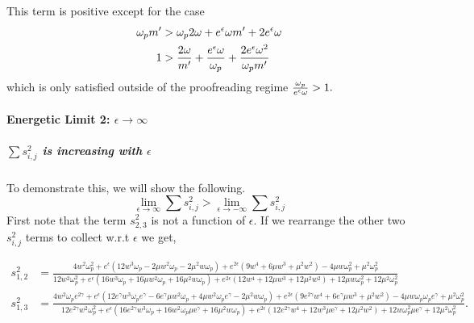 This term is positive except for the case
\[
\begin{aligned}
{\omega_p} m' &> {\omega_p} 2\omega + e^\epsilon \omega m' + 2 e^\epsilon \omega\\
1 &> \frac{2\omega}{m'} + \frac{e^\epsilon\omega}{{\omega_p}} + \frac{2e^\epsilon\omega^2}{{\omega_p} m'}
\end{aligned}
\]
which is only satisfied outside of the proofreading regime $\frac{{\omega_p}}{e^\epsilon\omega} > 1.$

\paragraph{Energetic Limit 2: $\epsilon\to\infty$}
\subparagraph{$\sum{s^2_{i,j}}$ is increasing with $\epsilon$} To demonstrate this, we will show the following.  
\[
\lim_{\epsilon\to\infty}\sum{s^2_{i,j}}>\lim_{\epsilon\to-\infty}\sum{s^2_{i,j}}
\]
First note that the term $s^2_{2,3}$ is not a function of $\epsilon$.  If we rearrange the other two $s^2_{i,j}$ terms to collect w.r.t $\epsilon$ we get,
\begin{widetext}
\begin{eqnarray*}
s^2_{1,2}&=\frac{4 w^2 \omega_p^2+e^{\epsilon } \left(12 w^3 \omega_p-2 \mu  w^2 \omega_p-2 \mu ^2 w \omega_p\right)+e^{2 \epsilon } \left(9 w^4+6 \mu  w^3+\mu ^2 w^2\right)-4 \mu  w \omega_p^2+\mu ^2 \omega_p^2}{12 w^2 \omega_p^2+e^{\epsilon } \left(16 w^3 \omega_p+16 \mu  w^2 \omega_p+16 \mu ^2 w \omega_p\right)+e^{2 \epsilon } \left(12 w^4+12 \mu  w^3+12 \mu ^2 w^2\right)+12 \mu  w \omega_p^2+12 \mu ^2 \omega_p^2}\\
s^2_{1,3}&=\frac{4 w^2 \omega_pe^{2 \gamma }+e^{\epsilon } \left(12 e^{\gamma } w^3 \omega_pe^{\gamma }-6 e^{\gamma } \mu  w^2 \omega_p+4 \mu  w^2 \omega_pe^{\gamma }-2 \mu ^2 w \omega_p\right)+e^{2 \epsilon } \left(9 e^{2 \gamma } w^4+6 e^{\gamma } \mu  w^3+\mu ^2 w^2\right)-4 \mu  w \omega_p \omega_p e^{\gamma }+\mu ^2 \omega_p^2}{12 e^{2 \gamma } w^2 \omega_p^2+e^{\epsilon } \left(16 e^{2 \gamma } w^3 \omega_p+16 w^2 \omega_p \text{$\mu $e}^{\gamma }+16 \mu ^2 w \omega_p\right)+e^{2 \epsilon } \left(12 e^{2 \gamma } w^4+12 w^3 \text{$\mu $e}^{\gamma }+12 \mu ^2 w^2\right)+12 w \omega_p^2 \text{$\mu $e}^{\gamma }+12 \mu ^2 \omega_p^2}.\\
\end{eqnarray*}
\end{widetext}

